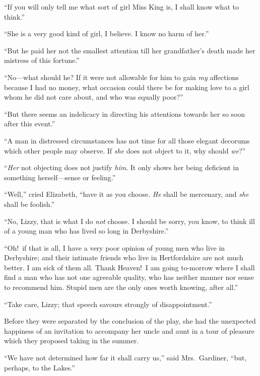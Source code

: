 \documentclass[12pt,english]{book}
\begin{document}
{}``If you will only tell me what sort of girl Miss King is, I shall
know what to think.''

{}``She is a very good kind of girl, I believe. I know no harm of
her.''

{}``But he paid her not the smallest attention till her grandfather's
death made her mistress of this fortune.''

{}``No\mbox{---}what should he? If it were not allowable for him
to gain \textit{my} affections because I had no money, what occasion
could there be for making love to a girl whom he did not care about,
and who was equally poor?''\ 

{}``But there seems an indelicacy in directing his attentions towards
her so soon after this event.''

{}``A man in distressed circumstances has not time for all those
elegant decorums which other people may observe. If \textit{she} does
not object to it, why should \textit{we}?''\ 

{}``\textit{Her} not objecting does not justify \textit{him}. It
only shows her being deficient in something herself\mbox{---}sense
or feeling.''

{}``Well,'' cried Elizabeth, {}``have it as you choose. \textit{He}
shall be mercenary, and \textit{she} shall be foolish.''

{}``No, Lizzy, that is what I do \textit{not} choose. I should be
sorry, you know, to think ill of a young man who has lived so long
in Derbyshire.''

{}``Oh!\ if that is all, I have a very poor opinion of young men
who live in Derbyshire; and their intimate friends who live in Hertfordshire
are not much better. I am sick of them all. Thank Heaven!\ I am going
to-morrow where I shall find a man who has not one agreeable quality,
who has neither manner nor sense to recommend him. Stupid men are
the only ones worth knowing, after all.''

{}``Take care, Lizzy; that speech savours strongly of disappointment.''

Before they were separated by the conclusion of the play, she had
the unexpected happiness of an invitation to accompany her uncle and
aunt in a tour of pleasure which they proposed taking in the summer.

{}``We have not determined how far it shall carry us,'' said Mrs.\ 
Gardiner, {}``but, perhaps, to the Lakes.''
\end{document}
